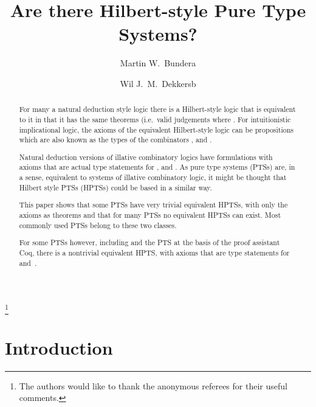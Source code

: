 \documentclass{LMCS}
\begin{document}
\title[Hilbert-style Pure Type Systems?]{Are there Hilbert-style Pure 
  Type Systems?}

\author[M.~W.~Bunder]{Martin W.~Bunder\rsuper a}	\address{{\lsuper a}School of Mathematics and Applied Statistics, 
University of Wollongong, Wollongong, NSW 2522, Australia}	   \thanks{{}The authors would like to thank the anonymous 
referees for their useful comments.}	

\author[W.~.J.~M.~Dekkers]{Wil J.~M.~Dekkers\rsuper b}	\address{{\lsuper b}Department of Computer Science, Radboud 
University Nijmegen, Toernooiveld 1, 6525 ED Nij\-megen, The Netherlands}





\begin{abstract}
  For many a natural deduction style logic there is a Hilbert-style
  logic that is equivalent to it in that it has the same theorems
  (i.e.\ valid judgements  where
  . For intuitionistic implicational logic, the
  axioms of the equivalent Hilbert-style logic can be propositions
  which are also known as the types of the combinators ,
   and .

  Natural deduction versions of illative combinatory logics have
  formulations with axioms that are actual type statements for ,  and . As pure type systems (PTSs) are, in
  a sense, equivalent to systems of illative combinatory logic, it
  might be thought that Hilbert style PTSs (HPTSs) could be based in a
  similar way.

  This paper shows that some PTSs have very trivial equivalent HPTSs,
  with only the axioms as theorems and that for many PTSs no
  equivalent HPTSs can exist.  Most commonly used PTSs belong to these
  two classes.

  For some PTSs however, including  and the PTS at the
  basis of the proof assistant Coq, there is a nontrivial equivalent
  HPTS, with axioms that are type statements for  and\
  .
\end{abstract}

\maketitle

\section*{Introduction}\label{S:one}
\end{document}
